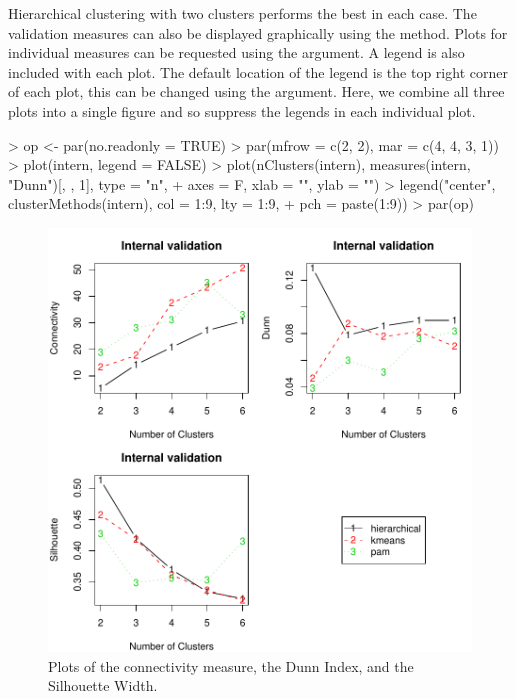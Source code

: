 \documentclass[11pt]{article}
\begin{document}
Hierarchical clustering with two clusters performs the best in each
case.  The validation measures can also be displayed graphically using
the  method.  Plots for individual measures can be requested
using the  argument.  A legend is also included with each plot.  The default location of the
legend is the top right corner of each plot, this can be changed using
the  argument.  Here, we combine all three plots into
a single figure and so suppress the legends in each individual plot.



\begin{Schunk}
\begin{Sinput}
> op <- par(no.readonly = TRUE)
> par(mfrow = c(2, 2), mar = c(4, 4, 3, 1))
> plot(intern, legend = FALSE)
> plot(nClusters(intern), measures(intern, "Dunn")[, , 1], type = "n", 
+     axes = F, xlab = "", ylab = "")
> legend("center", clusterMethods(intern), col = 1:9, lty = 1:9, 
+     pch = paste(1:9))
> par(op)
\end{Sinput}
\end{Schunk}

\begin{figure}
  \centering
\includegraphics{clValid-006}
  \caption{Plots of the connectivity measure, the Dunn Index, and the
    Silhouette Width.}
  \label{fig:internPlot}
\end{figure}
\end{document}
